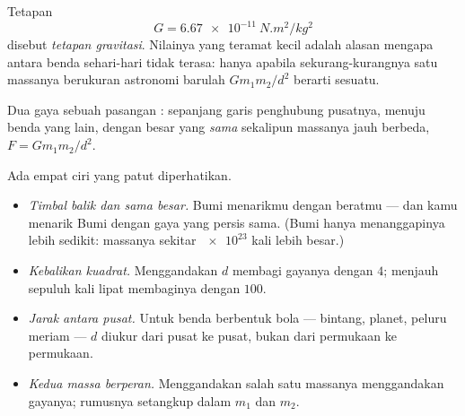 \begin{definition}\label{def:g10:universal-gravitation:constant}
Tetapan
\[
G = \qty{6.67e-11}{N.m^2/kg^2}
\]
disebut \emph{tetapan gravitasi}. Nilainya yang
teramat kecil adalah alasan mengapa  antara benda sehari-hari
tidak terasa: hanya apabila sekurang-kurangnya satu massanya berukuran
astronomi barulah $G m_1 m_2 / d^2$ berarti sesuatu.
\end{definition}

\begin{omfigure}

{\small Dua gaya sebuah pasangan : sepanjang garis
penghubung pusatnya, menuju benda yang lain, dengan besar yang
\emph{sama} sekalipun massanya jauh berbeda,
$F = G m_1 m_2 / d^2$.}
\end{omfigure}

\begin{remark}\label{rem:g10:universal-gravitation:reading}
Ada empat ciri yang patut diperhatikan.
\begin{itemize}
  \item \emph{Timbal balik dan sama besar.} Bumi menarikmu dengan
        beratmu --- dan kamu menarik Bumi dengan gaya yang persis sama.
        (Bumi hanya menanggapinya lebih sedikit: massanya sekitar
        $\num{e23}$ kali lebih besar.)
  \item \emph{Kebalikan kuadrat.} Menggandakan $d$ membagi gayanya
        dengan $4$; menjauh sepuluh kali lipat membaginya dengan $100$.
  \item \emph{Jarak antara pusat.} Untuk benda berbentuk bola ---
        bintang, planet, peluru meriam --- $d$ diukur dari pusat ke
        pusat, bukan dari permukaan ke permukaan.
  \item \emph{Kedua massa berperan.} Menggandakan salah satu massanya
        menggandakan gayanya; rumusnya setangkup dalam $m_1$ dan $m_2$.
\end{itemize}
\end{remark}

